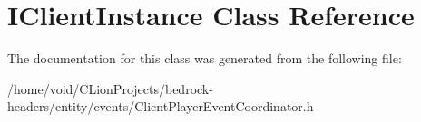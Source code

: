 \hypertarget{class_i_client_instance}{}\section{I\+Client\+Instance Class Reference}
\label{class_i_client_instance}


The documentation for this class was generated from the following file\+:\begin{DoxyCompactItemize}
\item 
/home/void/\+C\+Lion\+Projects/bedrock-\/headers/entity/events/Client\+Player\+Event\+Coordinator.\+h\end{DoxyCompactItemize}
